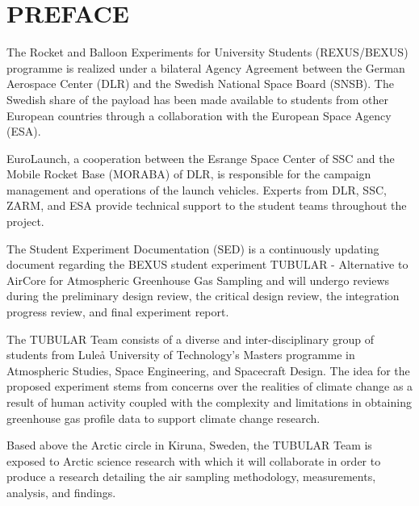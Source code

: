 \section*{PREFACE} \markboth{}{}

The Rocket and Balloon Experiments for University Students (REXUS/BEXUS) programme is realized under a bilateral Agency Agreement between the German Aerospace Center (DLR) and the Swedish National Space Board (SNSB). The Swedish share of the
payload has been made available to students from other European countries through a collaboration with the European Space Agency (ESA).

EuroLaunch, a cooperation between the Esrange Space Center of SSC and the Mobile Rocket Base (MORABA) of DLR, is responsible for the campaign management and operations of the launch vehicles. Experts from DLR, SSC, ZARM, and ESA provide
technical support to the student teams throughout the project.

The Student Experiment Documentation (SED) is a continuously updating document regarding the BEXUS student experiment TUBULAR - Alternative to AirCore for Atmospheric Greenhouse Gas Sampling and will undergo reviews during the preliminary design review, the critical design review, the integration progress review, and final experiment report.

The TUBULAR Team consists of a diverse and inter-disciplinary group of students from Luleå University of Technology's Masters programme in Atmospheric Studies, Space Engineering, and Spacecraft Design. The idea for the proposed experiment stems from concerns over the realities of climate change as a result of human activity coupled with the complexity and limitations in obtaining greenhouse gas profile data to support climate change research.

Based above the Arctic circle in Kiruna, Sweden, the TUBULAR Team is exposed to Arctic science research with which it will collaborate in order to produce a research detailing the air sampling methodology, measurements, analysis, and findings.

